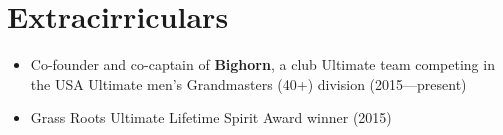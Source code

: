 \section{Extracirriculars}
\vspace{0.5em}

\begin{itemize}
  \item Co-founder and co-captain of \textbf{Bighorn}, a club Ultimate
    team competing in the USA Ultimate men's Grandmasters (40+)
    division (2015---present)
  \item Grass Roots Ultimate Lifetime Spirit Award winner (2015)
\end{itemize}

